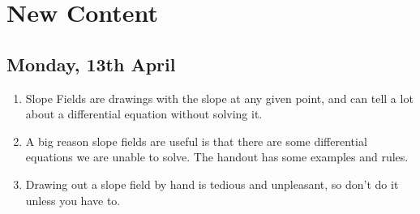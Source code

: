 \documentclass[11pt]{article}
\begin{document}
\section{New Content}
\subsection{Monday, 13th April}
\begin{enumerate}
	\item Slope Fields are drawings with the slope at any given point, and can 
		tell a lot about a differential equation without solving it.
	\item A big reason slope fields are useful is that there are some differential
		equations we are unable to solve.  The handout has some examples and rules.
	\item Drawing out a slope field by hand is tedious and unpleasant, so don't
		do it unless you have to.
\end{enumerate}
\end{document}
